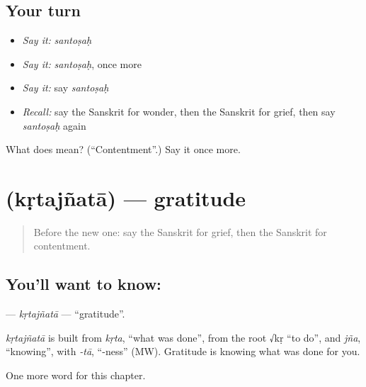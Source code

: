\subsection*{Your turn}
\begin{itemize}
\raggedright
  \item \emph{Say it:} \emph{santoṣaḥ}
  \item \emph{Say it:} \emph{santoṣaḥ}, once more
  \item \emph{Say it:} say \emph{santoṣaḥ}
  \item \emph{Recall:} say the Sanskrit for wonder, then the Sanskrit for grief, then say \emph{santoṣaḥ} again
\end{itemize}

\begin{tcolorbox}[breakable,colback=teal!4,colframe=teal!35!black,title={Before you move on}]
What does  mean? (\textquotedblleft{}Contentment\textquotedblright{}.) Say it once more.
\end{tcolorbox}
\section[\texorpdfstring{\sk{कृतज्ञता} (kṛtajñatā)}{कृतज्ञता (kṛtajñatā)}]{ (kṛtajñatā) — gratitude}

\label{lesson:SA-C182-krtajnata}



\begin{quote}
Before the new one: say the Sanskrit for grief, then the Sanskrit for contentment.
\end{quote}

\subsection*{You'll want to know: }
\textbf{} — \emph{kṛtajñatā} — \textquotedblleft{}gratitude\textquotedblright{}.

\begin{cousinweb}
\emph{kṛtajñatā} is built from \emph{kṛta}, \textquotedblleft{}what was done\textquotedblright{}, from the root √kṛ \textquotedblleft{}to do\textquotedblright{}, and \emph{jña}, \textquotedblleft{}knowing\textquotedblright{}, with \emph{-tā}, \textquotedblleft{}-ness\textquotedblright{} (MW). Gratitude is knowing what was done for you.
\end{cousinweb}

\begin{grammarlens}[title={What you've built}]
One more word for this chapter.
\end{grammarlens}

